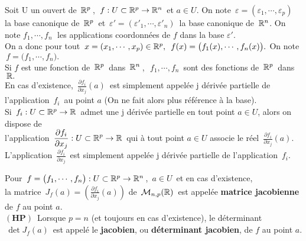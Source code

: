 \newpage

Soit U un ouvert de \(\,\mathbb{R}^p\,\), \(\,f:U\subset \mathbb{R}^p\to \mathbb{R}^n\,\) et \(a\in U\). On note \(\,\varepsilon=(\varepsilon_1,\cdots,\varepsilon_p)\,\) la base canonique de \(\,\mathbb{R}^p\,\) et \(\,\varepsilon'=(\varepsilon'_1,\cdots,\varepsilon'_n)\,\) la base canonique de \(\,\mathbb{R}^n\). On note \(f_1,\cdots,f_n\;\) les applications coordonnées de $f$ dans la base $\varepsilon'$. \\
On a donc pour tout \(\, x=(x_1,\cdots,x_p)\in \mathbb{R}^p,\ \,f(x)=\bigl(f_1(x),\cdots,f_n(x)\bigr).\) On note \(\,f=\bigl(f_1,\cdots,f_n\bigr).\)\\
Si $f$ est une fonction de \(\,\mathbb{R}^p\,\) dans \(\,\mathbb{R}^n\,\),\ \(\,f_1,\cdots,f_n\,\) sont des fonctions de \(\,\mathbb{R}^p\,\) dans \(\,\mathbb{R}.\)\vspace{0.1cm}\\
En cas d'existence, \(\,\displaystyle\frac{\partial f_i}{\partial x_j}(a)\,\) est simplement appelée j dérivée partielle de l'application $\,f_i\,$ au point $a$ (On ne fait alors plus référence à la base).\vspace{0.2cm}\\
Si \(\,f_i:U\subset \mathbb{R}^p\to \mathbb{R}\,\) admet une j dérivée partielle en tout point \(a\in U\), alors on dispose de\vspace{0.1cm}\\
l'application \(\,\displaystyle\frac{\partial f_i}{\partial x_j}:U\subset \mathbb{R}^p\to \mathbb{R}\,\) qui à tout point \(a\in U\) associe le réel \(\,\displaystyle\frac{\partial f_i}{\partial x_j}(a).\)\vspace{0.1cm}\\
L'application \(\,\displaystyle\frac{\partial f_i}{\partial x_j}\,\) est simplement appelée j dérivée partielle de l'application $\,f_i$.

\vspace{1.7cm}

Pour \(\,f=\bigl(f_1,\cdots,f_n\bigr):U\subset \mathbb{R}^p\to \mathbb{R}^n\,\), $\,a\in U\,$ et en cas d'existence,\vspace{0.2cm}\\
la matrice \(\,\displaystyle J_f(a)=\left(\frac{\partial f_i}{\partial x_j}(a)\!\right)\) de \(\,\mathcal{M}_{n,p}(\mathbb{R})\,\) est appelée \textbf{matrice jacobienne} de $f$ au point $a$.\vspace{0.2cm}\\
$\left(\mathbf{HP}\right)\,$ Lorsque $p=n$ (et toujours en cas d'existence), le déterminant $\,\det J_f(a)\,$ est appelé le \textbf{jacobien}, ou \textbf{déterminant jacobien}, de $f$ au point $a$.

